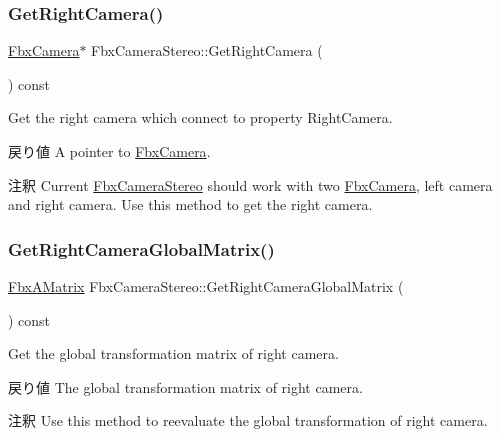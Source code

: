 \subsubsection{\texorpdfstring{Get\+Right\+Camera()}{GetRightCamera()}}
{\footnotesize\ttfamily \hyperlink{class_fbx_camera}{Fbx\+Camera}$\ast$ Fbx\+Camera\+Stereo\+::\+Get\+Right\+Camera (\begin{DoxyParamCaption}{ }\end{DoxyParamCaption}) const}

Get the right camera which connect to property Right\+Camera. \begin{DoxyReturn}{戻り値}
A pointer to \hyperlink{class_fbx_camera}{Fbx\+Camera}. 
\end{DoxyReturn}
\begin{DoxyRemark}{注釈}
Current \hyperlink{class_fbx_camera_stereo}{Fbx\+Camera\+Stereo} should work with two \hyperlink{class_fbx_camera}{Fbx\+Camera}, left camera and right camera. Use this method to get the right camera. 
\end{DoxyRemark}
\mbox{\label{class_fbx_camera_stereo_ae46b1246ccc65e2cb3e76cc3673172fd}} 
\subsubsection{\texorpdfstring{Get\+Right\+Camera\+Global\+Matrix()}{GetRightCameraGlobalMatrix()}}
{\footnotesize\ttfamily \hyperlink{class_fbx_a_matrix}{Fbx\+A\+Matrix} Fbx\+Camera\+Stereo\+::\+Get\+Right\+Camera\+Global\+Matrix (\begin{DoxyParamCaption}{ }\end{DoxyParamCaption}) const}

Get the global transformation matrix of right camera. \begin{DoxyReturn}{戻り値}
The global transformation matrix of right camera. 
\end{DoxyReturn}
\begin{DoxyRemark}{注釈}
Use this method to reevaluate the global transformation of right camera. 
\end{DoxyRemark}
\mbox{\label{class_fbx_camera_stereo_a111785c11520b456bb43ed6701eaa84d}} 

